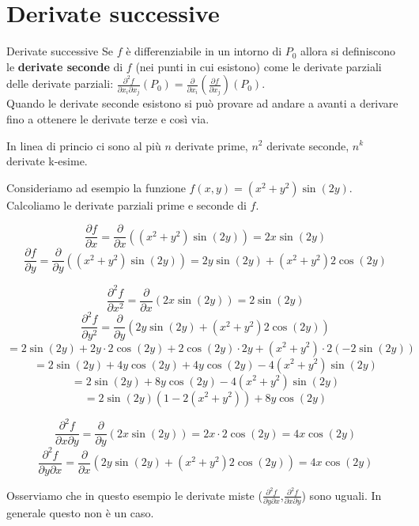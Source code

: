 \section{Derivate successive}
\begin{definizione}{Derivate successive}
  Se $f$ è differenziabile in un intorno di $P_0$ allora si definiscono le \textbf{derivate seconde} di $f$ (nei punti in cui esistono) come le derivate parziali delle derivate parziali: $\frac{\partial^2 f}{\partial x_i \partial x_j}(P_0) = \frac{\partial}{\partial x_i} \left(\frac{\partial f}{\partial x_j}\right)(P_0)$.  \\
  Quando le derivate seconde esistono si può provare ad andare a avanti a derivare fino a ottenere le derivate terze e così via.
\end{definizione}
\begin{osservazione}{}
  In linea di princio ci sono al più $n$ derivate prime, $n^2$ derivate seconde, $n^k$ derivate k-esime.
\end{osservazione}

Consideriamo ad esempio la funzione $f(x,y) = (x^2 + y^2)\sin(2y)$. Calcoliamo le derivate parziali prime e seconde di $f$.


\[
\frac{\partial f}{\partial x} = \frac{\partial}{\partial x} \left( (x^2 + y^2)\sin(2y) \right) = 2x\sin(2y)
\]
\[
\frac{\partial f}{\partial y} = \frac{\partial}{\partial y} \left( (x^2 + y^2)\sin(2y) \right) = 2y\sin(2y) + (x^2 + y^2)2\cos(2y)
\]

\[
\frac{\partial^2 f}{\partial x^2} = \frac{\partial}{\partial x} \left( 2x\sin(2y) \right) = 2\sin(2y)
\]
\[
\frac{\partial^2 f}{\partial y^2} = \frac{\partial}{\partial y} \left( 2y\sin(2y) + (x^2 + y^2)2\cos(2y) \right)
\]
\[
= 2\sin(2y) + 2y \cdot 2\cos(2y) + 2\cos(2y) \cdot 2y + (x^2 + y^2) \cdot 2(-2\sin(2y))
\]
\[
= 2\sin(2y) + 4y\cos(2y) + 4y\cos(2y) - 4(x^2 + y^2)\sin(2y)
\]
\[
= 2\sin(2y) + 8y\cos(2y) - 4(x^2 + y^2)\sin(2y)
\]
\[
= 2\sin(2y)(1 - 2(x^2 + y^2)) + 8y\cos(2y)
\]

\[
\frac{\partial^2 f}{\partial x \partial y} = \frac{\partial}{\partial y} \left( 2x\sin(2y) \right) = 2x \cdot 2\cos(2y) = 4x\cos(2y)
\]
\[
\frac{\partial^2 f}{\partial y \partial x} = \frac{\partial}{\partial x} \left( 2y\sin(2y) + (x^2 + y^2)2\cos(2y) \right) = 4x\cos(2y)
\]

Osserviamo che in questo esempio le derivate miste ($\frac{\partial^2 f}{\partial y \partial x}$,$\frac{\partial^2 f}{\partial x \partial y}$) sono uguali. In generale questo non è un caso.

